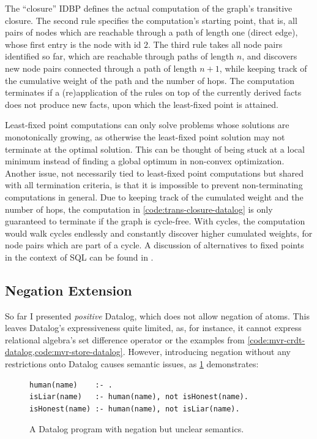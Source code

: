 The ``closure'' \ac{IDBP} defines the actual computation of the graph's
transitive closure.
The second rule specifies the computation's starting point,
that is, all pairs of nodes which are reachable through a path of length one
(direct edge), whose first entry is the node with id \(2\).
The third rule takes all node pairs identified so far, which are reachable
through paths of length \(n\), and discovers new node pairs connected
through a path of length \(n + 1\),
while keeping track of the cumulative weight of the path and the number of hops.
The computation terminates if a (re)application of the rules on top of the
currently derived facts does not produce new facts,
upon which the least-fixed point is attained.

Least-fixed point computations can only solve problems whose solutions
are monotonically growing, as otherwise the least-fixed point solution may not
terminate at the optimal solution.
This can be thought of being stuck at a local minimum instead of finding
a global optimum in non-convex optimization.
Another issue, not necessarily tied to least-fixed point computations but shared
with all termination criteria, is that it is impossible to prevent
non-terminating computations in general.
Due to keeping track of the cumulated weight and the number of hops,
the computation in \ref{code:trans-closure-datalog} is only guaranteed to terminate
if the graph is cycle-free.
With cycles, the computation would walk cycles endlessly and constantly discover
higher cumulated weights, for node pairs which are part of a cycle.
A discussion of alternatives to fixed points in the context of SQL
can be found in \cite{hirn2023fix}.

\subsection{Negation Extension}\label{sec:datalog-negation}

So far I presented \emph{positive} Datalog, which does not allow negation of
atoms.
This leaves Datalog's expressiveness quite limited, as, for instance, it cannot
express relational algebra's set difference operator or the examples
from \ref{code:mvr-crdt-datalog,code:mvr-store-datalog}.
However, introducing negation without any restrictions onto Datalog causes
semantic issues, as \ref{code:negative-datalog-issue} demonstrates:

\begin{figure}[htpb]
    \centering
    \begin{lstlisting}[keepspaces]
human(name)    :- .
isLiar(name)   :- human(name), not isHonest(name).
isHonest(name) :- human(name), not isLiar(name).
\end{lstlisting}
    \caption{A Datalog program with negation but unclear semantics.}\label{code:negative-datalog-issue}
\end{figure}

